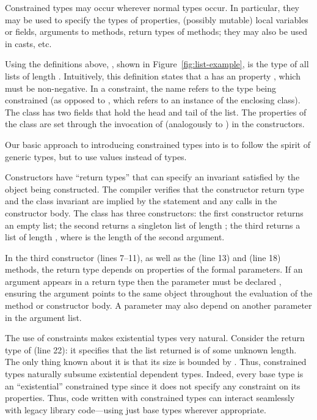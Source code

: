 Constrained types may occur wherever normal types occur. In
particular, they may be used to specify the types of properties,
(possibly mutable) local variables or fields,
arguments to methods, return types of methods; they may also be
used in casts, etc.

Using the definitions above, , shown in
Figure~\ref{fig:list-example}, is the type of all lists of
length .
%
Intuitively, this definition states that a  has an 
property , which must be non-negative.
In a constraint, the name  refers to the type being
constrained (as opposed to , which refers to
an instance of the enclosing class).
The class has two
fields that hold the head and tail of the list.  The properties
of the
class are set through the invocation of \tcd{(\ldots)}
(analogously to \tcd{(\ldots)}) in the constructors.

Our basic approach to introducing constrained types into \Xten{}
is to follow the spirit of generic types, but to use values
instead of types.

Constructors have ``return
types'' that can specify an invariant satisfied by the object being
constructed.  The compiler verifies that the
constructor return type and the class invariant are implied by the
 statement and any  calls in the constructor
body.
The  class has three constructors: the first
constructor returns an empty list; the second returns 
a singleton list of length ; the third
returns a list of length , where  is
the length of the second argument.

In the third constructor (lines 7--11), as well as 
the  (line 13) and  (line 18) methods,
the return type
depends on properties of the formal parameters. 
If an argument appears in a
return type then the parameter must be declared ,
ensuring the
argument points to the same object throughout the evaluation of
the method or constructor body.  A parameter may also depend on
another parameter in the argument list.

The use of constraints makes existential types very natural.
Consider the return type of  (line 22): it specifies
that the list returned is of some unknown length. The only thing
known about it is that its size is bounded by .
Thus,
constrained types naturally subsume existential dependent types.
Indeed, every base type  is an ``existential''
constrained type since it does not specify any constraint on its
properties. Thus, code written with constrained types can
interact seamlessly with legacy library code---using just base
types wherever appropriate.

